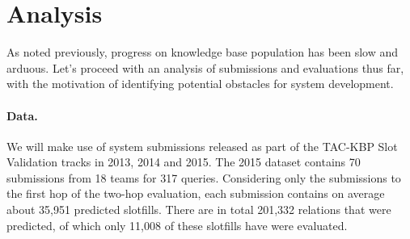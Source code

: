 \section{Analysis}
\label{sec:analysis}

As noted previously, progress on knowledge base population has been slow and arduous.
Let's proceed with an analysis of submissions and evaluations thus far, with the motivation of identifying potential obstacles for system development. 

\paragraph{Data.}
We will make use of system submissions released as part of the TAC-KBP Slot Validation tracks in 2013, 2014 and 2015.
The 2015 dataset contains 70 submissions from 18 teams for 317 queries.
Considering only the submissions to the first hop of the two-hop evaluation,
each submission contains on average about 35,951 predicted slotfills. 
There are in total 201,332 relations that were predicted, of which only 11,008 of these slotfills have were evaluated.


